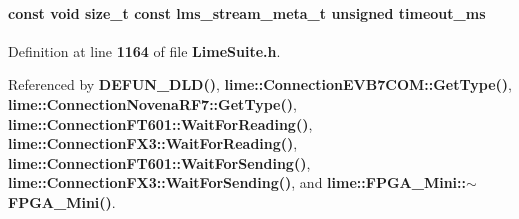 \paragraph[{timeout\+\_\+ms}]{\setlength{\rightskip}{0pt plus 5cm}const {\bf void} size\+\_\+t const {\bf lms\+\_\+stream\+\_\+meta\+\_\+t} unsigned timeout\+\_\+ms}\label{group__FN__STREAM_ga99d39cc472ce807b89adc26e7deea42e}


Definition at line {\bf 1164} of file {\bf Lime\+Suite.\+h}.



Referenced by {\bf D\+E\+F\+U\+N\+\_\+\+D\+L\+D()}, {\bf lime\+::\+Connection\+E\+V\+B7\+C\+O\+M\+::\+Get\+Type()}, {\bf lime\+::\+Connection\+Novena\+R\+F7\+::\+Get\+Type()}, {\bf lime\+::\+Connection\+F\+T601\+::\+Wait\+For\+Reading()}, {\bf lime\+::\+Connection\+F\+X3\+::\+Wait\+For\+Reading()}, {\bf lime\+::\+Connection\+F\+T601\+::\+Wait\+For\+Sending()}, {\bf lime\+::\+Connection\+F\+X3\+::\+Wait\+For\+Sending()}, and {\bf lime\+::\+F\+P\+G\+A\+\_\+\+Mini\+::$\sim$\+F\+P\+G\+A\+\_\+\+Mini()}.

